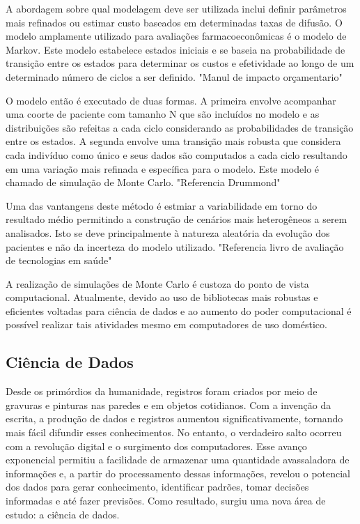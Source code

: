 \documentclass[article,a4paper,12pt,brazil,sumario=tradicional]{abntex2}
\begin{document}
A abordagem sobre qual modelagem deve ser utilizada inclui definir parâmetros mais refinados ou estimar custo baseados em determinadas taxas de difusão. O modelo amplamente utilizado para avaliações farmacoeconômicas é o modelo de Markov. Este modelo estabelece estados iniciais e se baseia na probabilidade de transição entre os estados para determinar os custos e efetividade ao longo de um determinado número de ciclos a ser definido.
"Manul de impacto orçamentario"

O modelo então é executado de duas formas. A primeira envolve acompanhar uma coorte de paciente com tamanho N que são incluídos no modelo e as distribuições são refeitas a cada ciclo considerando as probabilidades de transição entre os estados. A segunda envolve uma transição mais robusta que considera cada indivíduo como único e seus dados são computados a cada ciclo resultando em uma variação mais refinada e específica para o modelo. Este modelo é chamado de simulação de Monte Carlo.
"Referencia Drummond"

Uma das vantangens deste método é estmiar a variabilidade em torno do resultado médio permitindo a construção de cenários mais heterogêneos a serem analisados. Isto se deve principalmente à natureza aleatória da evolução dos pacientes e não da incerteza do modelo utilizado.
"Referencia livro de avaliação de tecnologias em saúde"

A realização de simulações de Monte Carlo é custoza do ponto de vista computacional. Atualmente, devido ao uso de bibliotecas mais robustas e eficientes voltadas para ciência de dados e ao aumento do poder computacional é possível realizar tais atividades mesmo em computadores de uso doméstico.


\subsection{Ciência de Dados}

Desde os primórdios da humanidade, registros foram criados por meio de gravuras e pinturas nas paredes e em objetos cotidianos. Com a invenção da escrita, a produção de dados e registros aumentou significativamente, tornando mais fácil difundir esses conhecimentos. No entanto, o verdadeiro salto ocorreu com a revolução digital e o surgimento dos computadores. Esse avanço exponencial permitiu a facilidade de armazenar uma quantidade avassaladora de informações e, a partir do processamento dessas informações, revelou o potencial dos dados para gerar conhecimento, identificar padrões, tomar decisões informadas e até fazer previsões. Como resultado, surgiu uma nova área de estudo: a ciência de dados.
\end{document}
